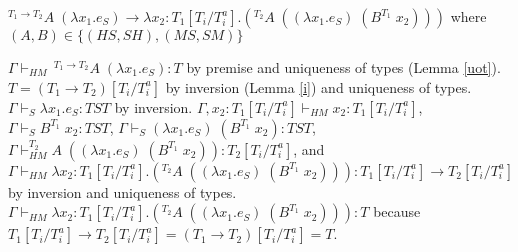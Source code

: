 \begin{case}
$^{T_{1}\rightarrow T_{2}}A\;(\lambda x_{1}.e_{S})\rightarrow\lambda x_{2}:T_{1}[T_{i}/T_{i}^{a}].(^{T_{2}}A\;((\lambda x_{1}.e_{S})\;(B^{T_{1}}\;x_{2})))$ where $(A,B)\in\lbrace(HS,SH),(MS,SM)\rbrace$

$\Gamma\vdash_{HM}\,^{T_{1}\rightarrow T_{2}}A\;(\lambda x_{1}.e_{S}):T$ by premise and uniqueness of types (Lemma \ref{uot}).  $T=(T_{1}\rightarrow T_{2})[T_{i}/T_{i}^{a}]$ by inversion (Lemma \ref{i}) and uniqueness of types.  $\Gamma\vdash_{S}\lambda x_{1}.e_{S}:TST$ by inversion.  $\Gamma,x_{2}:T_{1}[T_{i}/T_{i}^{a}]\vdash_{HM}x_{2}:T_{1}[T_{i}/T_{i}^{a}]$, $\Gamma\vdash_{S}B^{T_{1}}\;x_{2}:TST$, $\Gamma\vdash_{S}(\lambda x_{1}.e_{S})\;(B^{T_{1}}\;x_{2}):TST$, $\Gamma\vdash_{HM}^{T_{2}}A\;((\lambda x_{1}.e_{S})\;(B^{T_{1}}\;x_{2})):T_{2}[T_{i}/T_{i}^{a}]$, and $\Gamma\vdash_{HM}\lambda x_{2}:T_{1}[T_{i}/T_{i}^{a}].(^{T_{2}}A\;((\lambda x_{1}.e_{S})\;(B^{T_{1}}\;x_{2}))):T_{1}[T_{i}/T_{i}^{a}]\rightarrow T_{2}[T_{i}/T_{i}^{a}]$ by inversion and uniqueness of types.  $\Gamma\vdash_{HM}\lambda x_{2}:T_{1}[T_{i}/T_{i}^{a}].(^{T_{2}}A\;((\lambda x_{1}.e_{S})\;(B^{T_{1}}\;x_{2}))):T$ because $T_{1}[T_{i}/T_{i}^{a}]\rightarrow T_{2}[T_{i}/T_{i}^{a}]=(T_{1}\rightarrow T_{2})[T_{i}/T_{i}^{a}]=T$.
\end{case}